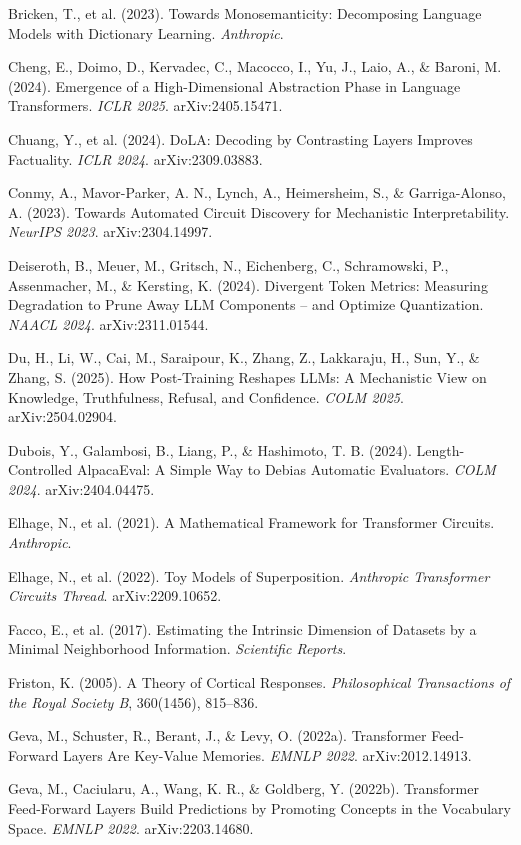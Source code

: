 \documentclass[11pt]{article}
\begin{document}
Bricken, T., et al. (2023). Towards Monosemanticity: Decomposing Language Models with Dictionary Learning. \emph{Anthropic}.

Cheng, E., Doimo, D., Kervadec, C., Macocco, I., Yu, J., Laio, A., \& Baroni, M. (2024). Emergence of a High-Dimensional Abstraction Phase in Language Transformers. \emph{ICLR 2025}. arXiv:2405.15471.

Chuang, Y., et al. (2024). DoLA: Decoding by Contrasting Layers Improves Factuality. \emph{ICLR 2024}. arXiv:2309.03883.

Conmy, A., Mavor-Parker, A. N., Lynch, A., Heimersheim, S., \& Garriga-Alonso, A. (2023). Towards Automated Circuit Discovery for Mechanistic Interpretability. \emph{NeurIPS 2023}. arXiv:2304.14997.

Deiseroth, B., Meuer, M., Gritsch, N., Eichenberg, C., Schramowski, P., Assenmacher, M., \& Kersting, K. (2024). Divergent Token Metrics: Measuring Degradation to Prune Away LLM Components -- and Optimize Quantization. \emph{NAACL 2024}. arXiv:2311.01544.

Du, H., Li, W., Cai, M., Saraipour, K., Zhang, Z., Lakkaraju, H., Sun, Y., \& Zhang, S. (2025). How Post-Training Reshapes LLMs: A Mechanistic View on Knowledge, Truthfulness, Refusal, and Confidence. \emph{COLM 2025}. arXiv:2504.02904.

Dubois, Y., Galambosi, B., Liang, P., \& Hashimoto, T. B. (2024). Length-Controlled AlpacaEval: A Simple Way to Debias Automatic Evaluators. \emph{COLM 2024}. arXiv:2404.04475.

Elhage, N., et al. (2021). A Mathematical Framework for Transformer Circuits. \emph{Anthropic}.

Elhage, N., et al. (2022). Toy Models of Superposition. \emph{Anthropic Transformer Circuits Thread}. arXiv:2209.10652.

Facco, E., et al. (2017). Estimating the Intrinsic Dimension of Datasets by a Minimal Neighborhood Information. \emph{Scientific Reports}.

Friston, K. (2005). A Theory of Cortical Responses. \emph{Philosophical Transactions of the Royal Society B}, 360(1456), 815--836.

Geva, M., Schuster, R., Berant, J., \& Levy, O. (2022a). Transformer Feed-Forward Layers Are Key-Value Memories. \emph{EMNLP 2022}. arXiv:2012.14913.

Geva, M., Caciularu, A., Wang, K. R., \& Goldberg, Y. (2022b). Transformer Feed-Forward Layers Build Predictions by Promoting Concepts in the Vocabulary Space. \emph{EMNLP 2022}. arXiv:2203.14680.
\end{document}
